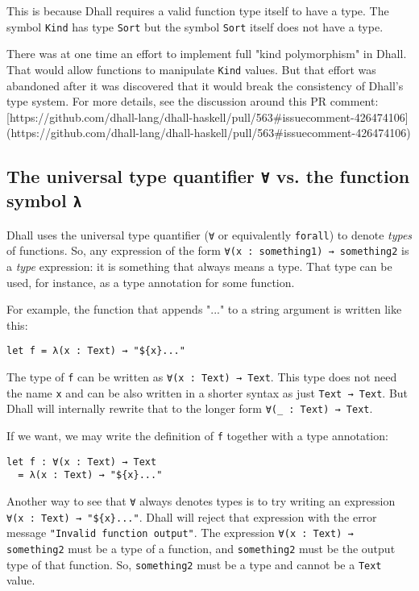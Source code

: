 This is because Dhall requires a valid function type itself to have a type.
The symbol \lstinline!Kind! has type \lstinline!Sort! but the symbol \lstinline!Sort! itself does not have a type.


There was at one time an effort to implement full "kind polymorphism" in Dhall.
That would allow functions to manipulate \lstinline!Kind! values.
But that effort was abandoned after it was discovered that it would break the consistency of Dhall's type system.
For more details, see the discussion around this PR comment: [https://github.com/dhall-lang/dhall-haskell/pull/563#issuecomment-426474106](https://github.com/dhall-lang/dhall-haskell/pull/563#issuecomment-426474106)


\subsection{The universal type quantifier \lstinline!∀! vs. the function symbol \lstinline!λ!}


Dhall uses the universal type quantifier (\lstinline!∀! or equivalently \lstinline!forall!) to denote \emph{types} of functions.
So, any expression of the form \lstinline!∀(x : something1) → something2! is a \emph{type} expression: it is something that always means a type.
That type can be used, for instance, as a type annotation for some function.


For example, the function that appends "..." to a string argument is written like this:


\begin{lstlisting}[language=Dhall]
let f = λ(x : Text) → "${x}..."
\end{lstlisting}


The type of \lstinline!f! can be written as \lstinline!∀(x : Text) → Text!.
This type does not need the name \lstinline!x! and can be also written in a shorter syntax as just \lstinline!Text → Text!.
But Dhall will internally rewrite that to the longer form \lstinline!∀(_ : Text) → Text!.


If we want, we may write the definition of \lstinline!f! together with a type annotation:


\begin{lstlisting}[language=Dhall]
let f : ∀(x : Text) → Text
  = λ(x : Text) → "${x}..."
\end{lstlisting}


Another way to see that \lstinline!∀! always denotes types is to try writing an expression \lstinline!∀(x : Text) → "${x}..."!.
Dhall will reject that expression with the error message \lstinline!"Invalid function output"!.
The expression \lstinline!∀(x : Text) → something2! must be a type of a function, and \lstinline!something2! must be the output type of that function. So, \lstinline!something2! must be a type and cannot be a \lstinline!Text! value.


